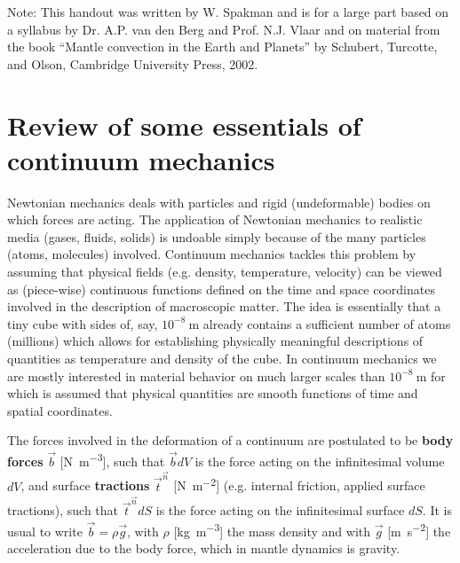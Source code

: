 Note: 
This handout was written by W. Spakman and 
is for a large part based on a syllabus by Dr. A.P. van den Berg and Prof. N.J. Vlaar
and on material from the book “Mantle convection in the Earth and Planets” by Schubert, Turcotte,
and Olson, Cambridge University Press, 2002.

\section{Review of some essentials of continuum mechanics}


Newtonian mechanics deals with particles and rigid (undeformable) bodies on which
forces are acting. The application of Newtonian mechanics to realistic media (gases,
fluids, solids) is undoable simply because of the many particles (atoms, molecules)
involved. Continuum mechanics tackles this problem by assuming that physical fields
(e.g. density, temperature, velocity) can be viewed as (piece-wise) continuous functions
defined on the time and space coordinates involved in the description of macroscopic
matter. The idea is essentially that a tiny cube with sides of, 
say, $10^{-8}~\si{\meter}$ already contains
a sufficient number of atoms (millions) which allows for establishing physically
meaningful descriptions of quantities as temperature and density of the cube. In
continuum mechanics we are mostly interested in material behavior on much larger scales
than $10^{-8}~\si{\meter}$ for which is assumed that physical quantities 
are smooth functions of time and spatial coordinates.


The forces involved in the deformation of a continuum are postulated to be 
{\bf body forces}
$\vec{b}$ [\si{\newton\per\cubic\meter}], 
such that $\vec{b}dV$ is the force acting on the infinitesimal 
volume $dV$, and surface 
{\bf tractions} $\vec{t}^{\vec n}$ [\si{\newton\per\square\meter}]
(e.g. internal friction, applied surface tractions), 
such that $\vec{t}^{\vec n} dS$ is the
force acting on the infinitesimal surface $dS$. 
It is usual to write $\vec{b} = \rho \vec{g}$, 
with $\rho$ [\si{\kg\per\cubic\meter}] the
mass density and with $\vec{g}$ [\si{\meter\per\square\second}]
the acceleration due to the body force, which in
mantle dynamics is gravity. 

